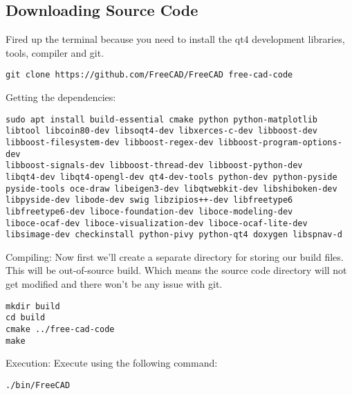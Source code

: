 \subsection{Downloading Source Code}
Fired up the terminal because you need to install the qt4 development libraries, tools, compiler and git.
\begin{lstlisting} 
git clone https://github.com/FreeCAD/FreeCAD free-cad-code
\end{lstlisting} 
Getting the dependencies:
\begin{lstlisting}                                                      
sudo apt install build-essential cmake python python-matplotlib 
libtool libcoin80-dev libsoqt4-dev libxerces-c-dev libboost-dev 
libboost-filesystem-dev libboost-regex-dev libboost-program-options-dev 
libboost-signals-dev libboost-thread-dev libboost-python-dev 
libqt4-dev libqt4-opengl-dev qt4-dev-tools python-dev python-pyside 
pyside-tools oce-draw libeigen3-dev libqtwebkit-dev libshiboken-dev 
libpyside-dev libode-dev swig libzipios++-dev libfreetype6 
libfreetype6-dev liboce-foundation-dev liboce-modeling-dev 
liboce-ocaf-dev liboce-visualization-dev liboce-ocaf-lite-dev 
libsimage-dev checkinstall python-pivy python-qt4 doxygen libspnav-d              
\end{lstlisting} 
Compiling:
Now first we’ll create a separate directory for storing our build files. 
This will be out-of-source build. Which means the source code directory 
will not get modified and there won’t be any issue with git.
\begin{lstlisting} 
mkdir build
cd build
cmake ../free-cad-code
make
\end{lstlisting} 
Execution:
Execute using the following command:
\begin{lstlisting}                                                      
./bin/FreeCAD
\end{lstlisting}                                                      

